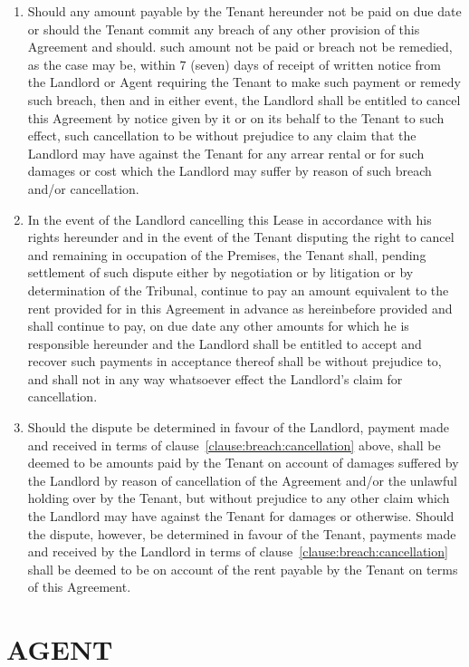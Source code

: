 \documentclass[11pt]{article}
\begin{document}
\begin{enumerate}
	\item Should any amount payable by the Tenant hereunder not be paid on due date or should the Tenant commit any breach of any other provision of this Agreement and should. such amount not be paid or breach not be remedied, as the case may be, within 7 (seven) days of receipt of written notice from the Landlord or Agent requiring the Tenant to make such payment or remedy such breach, then and in either event, the Landlord shall be entitled to cancel this Agreement by notice given by it or on its behalf to the Tenant to such effect, such cancellation to be without prejudice to any claim that the Landlord may have against the Tenant for any arrear rental or for such damages or cost which the Landlord may suffer by reason of such breach and/or cancellation.
	\item In the event of the Landlord cancelling this Lease in accordance with his rights hereunder and in the event of the Tenant disputing the right to cancel and remaining in occupation of the Premises, the Tenant shall, pending settlement of such dispute either by negotiation or by litigation or by determination of the Tribunal, continue to pay an amount equivalent to the rent provided for in this Agreement in advance as hereinbefore provided and shall continue to pay, on due date any other amounts for which he is responsible hereunder and the Landlord shall be entitled to accept and recover such payments in acceptance thereof shall be without prejudice to, and shall not in any way whatsoever effect the Landlord's claim for cancellation. \label{clause:breach:cancellation}
	\item Should the dispute be determined in favour of the Landlord, payment made and received in terms of clause~\ref{clause:breach:cancellation} above, shall be deemed to be amounts paid by the Tenant on account of damages suffered by the Landlord by reason of cancellation of the Agreement and/or the unlawful holding over by the Tenant, but without prejudice to any other claim which the Landlord may have against the Tenant for damages or otherwise. Should the dispute, however, be determined in favour of the Tenant, payments made and received by the Landlord in terms of clause~\ref{clause:breach:cancellation} shall be deemed to be on account of the rent payable by the Tenant on terms of this Agreement.
\end{enumerate}

\section{\uppercase{agent}}
\label{sec:agent}
\end{document}

